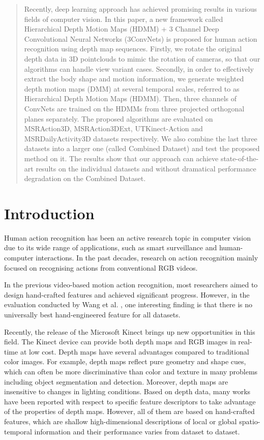 \documentclass[conference]{IEEEtran}
\begin{document}
\begin{abstract}
Recently, deep learning approach has achieved promising results in various fields of computer vision. In this paper, a new framework called Hierarchical Depth Motion Maps (HDMM) + 3 Channel Deep Convolutional Neural Networks (3ConvNets) is proposed for human action recognition using depth map sequences. Firstly, we rotate the original depth data in 3D pointclouds to mimic the rotation of cameras, so that our algorithms can handle view variant cases. Secondly, in order to effectively extract the body shape and motion information, we generate weighted depth motion maps (DMM) at several temporal scales, referred to as Hierarchical Depth Motion Maps (HDMM). Then, three channels of ConvNets are trained on the HDMMs from three projected orthogonal planes separately. The proposed algorithms are evaluated on MSRAction3D, MSRAction3DExt, UTKinect-Action and MSRDailyActivity3D datasets respectively. We also combine the last three datasets into a larger one (called Combined Dataset) and test the proposed method on it. The results show that our approach can achieve state-of-the-art results on the individual datasets and without dramatical performance degradation on the Combined Dataset.
\end{abstract}

\section{Introduction}

Human action recognition has been an active research topic in computer vision due to its wide range of applications, such as smart surveillance and human-computer interactions. In the past decades, research on action recognition mainly focused on recognising actions from conventional RGB videos.

In the previous video-based motion action recognition, most researchers aimed to design hand-crafted features and achieved significant progress. However, in the evaluation conducted by Wang et al. \cite{wang2009evaluation}, one interesting finding is that there is no universally best hand-engineered feature for all datasets.
 

Recently, the release of the Microsoft Kinect brings up new opportunities in this field. The Kinect device can provide both depth maps and RGB images in real-time at low cost. Depth maps have several advantages compared to traditional color images. For example, depth maps reflect pure geometry and shape cues, which can often be more discriminative than color and texture in many problems including object segmentation and detection. Moreover, depth maps are insensitive to changes in lighting conditions. Based on depth data, many works \cite{Li2010, wang2012mining, Oreifej2013, yangsuper} have been reported with respect to specific feature descriptors to take advantage of the properties of depth maps. However, all of them are based on hand-crafted features, which are shallow high-dimensional descriptions of local or global spatio-temporal information and their performance varies from dataset to dataset. 
\end{document}
